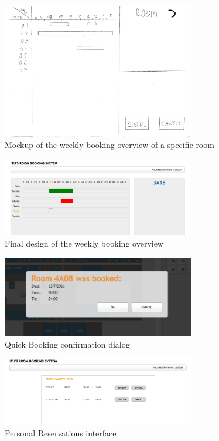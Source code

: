 \begin{figure}
\begin{center}
\leavevmode
\includegraphics[width=0.75\textwidth]{images/booking_overview}
\end{center}
\caption{Mockup of the weekly booking overview of a specific room}
\label{fig:app1_mock3_1}
\end{figure}

\begin{figure}
\begin{center}
\leavevmode
\includegraphics[width=0.75\textwidth]{images/simple_booking}
\end{center}
\caption{Final design of the weekly booking overview}
\label{fig:app1_mock3_2}
\end{figure}

\begin{figure}
\begin{center}
\leavevmode
\includegraphics[width=0.75\textwidth]{images/quick_booking}
\end{center}
\caption{Quick Booking confirmation dialog}
\label{fig:app1_mock1_7}
\end{figure}

\begin{figure}
\begin{center}
\leavevmode
\includegraphics[width=0.75\textwidth]{images/reservations}
\end{center}
\caption{Personal Reservations interface}
\label{fig:app1_mock3_2}
\end{figure}

\clearpage
